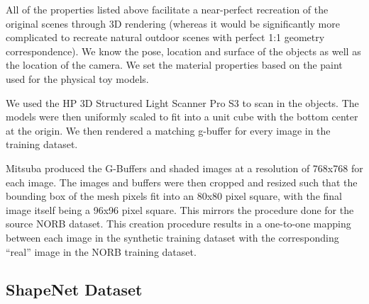 \documentclass[10pt,twocolumn,letterpaper]{article}
\begin{document}
 All of the properties listed above facilitate a near-perfect recreation of the original scenes through 3D rendering (whereas it would be significantly more complicated to recreate natural outdoor scenes with perfect 1:1 geometry correspondence). We know the pose, location and surface of the objects as well as the location of the camera. We set the material properties based on the paint used for the physical toy models.
 
We used the HP 3D Structured Light Scanner Pro S3\cite{HPSCANNER} to scan in the objects. The models were then uniformly scaled to fit into a unit cube with the bottom center at the origin. We then rendered a matching g-buffer for every image in the training dataset.  

Mitsuba produced the G-Buffers and shaded images at a resolution of 768x768 for each image.  The images and buffers were then cropped and resized such that the bounding box of the mesh pixels fit into an 80x80 pixel square, with the final image itself being a 96x96 pixel square. This mirrors the procedure done for the source NORB dataset. This creation procedure results in a one-to-one mapping between each image in the synthetic training dataset with the corresponding ``real'' image in the NORB training dataset.
\subsection{ShapeNet Dataset}
\end{document}
